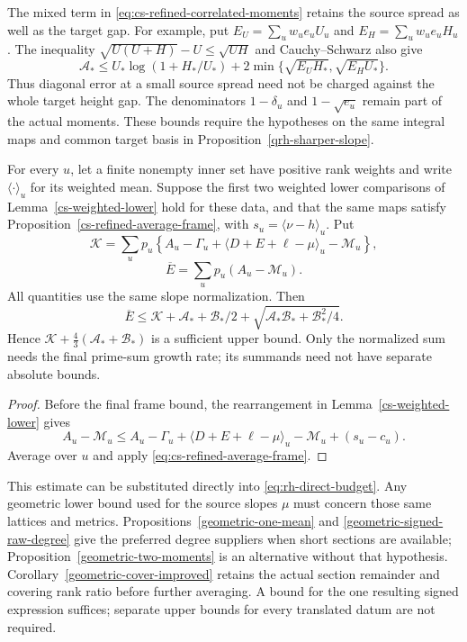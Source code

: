 The mixed term in \eqref{eq:cs-refined-correlated-moments} retains
the source spread as well as the target gap. For example, put
$E_U=\sum_uw_ue_uU_u$ and $E_H=\sum_uw_ue_uH_u$. The inequality
$\sqrt{U(U+H)}-U\le\sqrt{UH}$ and Cauchy--Schwarz also give
\[
 \mathcal A_*\le U_*\log(1+H_*/U_*)+
                   2\min\{\sqrt{E_UH_*},\sqrt{E_HU_*}\}.
\]
Thus diagonal error at a small source spread need not be charged
against the whole target height gap. The denominators
$1-\delta_u$ and $1-\sqrt{e_u}$ remain part of the actual moments.
These bounds require the hypotheses on the same integral maps and
common target basis in Proposition~\ref{qrh-sharper-slope}.

\begin{corollary}
\label{cs-refined-combined-budget}
For every $u$, let a finite nonempty inner set have positive rank
weights and write $\langle\cdot\rangle_u$ for its weighted mean.
Suppose the first two weighted lower comparisons of
Lemma~\ref{cs-weighted-lower} hold for these data, and that the same
maps satisfy Proposition~\ref{cs-refined-average-frame}, with
$s_u=\langle\nu-h\rangle_u$. Put
\[
 \mathcal K=\sum_up_u\left\{
 A_u-\Gamma_u+\langle D+E+\ell-\mu\rangle_u-\mathcal M_u
 \right\},
\]
\[
 \overline E=\sum_up_u(A_u-\mathcal M_u).
\]
All quantities use the same slope normalization. Then
\[
 \overline E\le\mathcal K+\mathcal A_*+\mathcal B_*/2+
                   \sqrt{\mathcal A_*\mathcal B_*+\mathcal B_*^2/4}.
\]
Hence $\mathcal K+\tfrac43(\mathcal A_*+\mathcal B_*)$ is a
sufficient upper bound. Only the normalized sum needs the final
prime-sum growth rate; its summands need not have separate absolute bounds.
\end{corollary}
\begin{proof}
Before the final frame bound, the rearrangement in
Lemma~\ref{cs-weighted-lower} gives
\[
 A_u-\mathcal M_u\le
 A_u-\Gamma_u+\langle D+E+\ell-\mu\rangle_u-\mathcal M_u
                         +(s_u-c_u).
\]
Average over $u$ and apply \eqref{eq:cs-refined-average-frame}.
\end{proof}

This estimate can be substituted directly into
\eqref{eq:rh-direct-budget}. Any geometric lower bound used for
the source slopes $\mu$ must concern those same lattices and metrics.
Propositions~\ref{geometric-one-mean} and
\ref{geometric-signed-raw-degree} give the preferred degree suppliers
when short sections are available; Proposition~\ref{geometric-two-moments}
is an alternative without that hypothesis.
Corollary~\ref{geometric-cover-improved} retains the actual section remainder
and covering rank ratio before further averaging. A bound for the
one resulting signed expression suffices; separate upper bounds for
every translated datum are not required.

